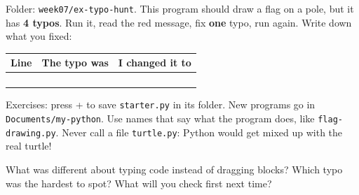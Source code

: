\begin{exercise}
Folder: \texttt{week07/ex-typo-hunt}. This program should draw a flag on a pole, but it has \textbf{4 typos}. Run it, read the red message, fix \textbf{one} typo, run again. Write down what you fixed:
\begin{center}
\renewcommand{\arraystretch}{1.6}
\begin{tabular}{@{}p{2cm}p{5cm}p{5cm}@{}}
\toprule
Line & The typo was & I changed it to\\
\midrule
 & & \\ \midrule
 & & \\ \midrule
 & & \\ \midrule
 & & \\
\bottomrule
\end{tabular}
\end{center}
\end{exercise}

\begin{tip}
Exercises: press + to save \texttt{starter.py} in its folder. New programs go in \texttt{Documents/my-python}. Use names that say what the program does, like \texttt{flag-drawing.py}. Never call a file \texttt{turtle.py}: Python would get mixed up with the real turtle!
\end{tip}

\begin{vocab}
\end{vocab}

\begin{reflection}
What was different about typing code instead of dragging blocks?
Which typo was the hardest to spot? What will you check first next time?
\end{reflection}
